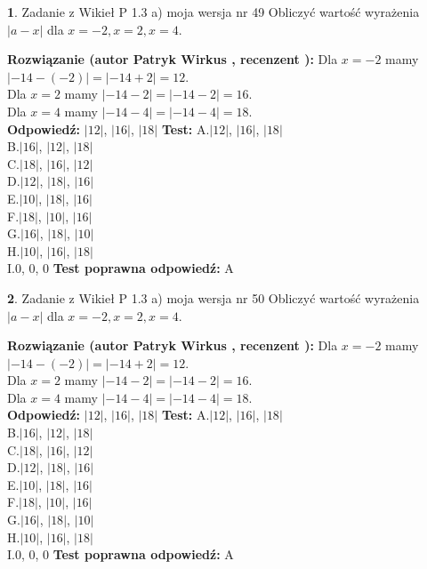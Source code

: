 \documentclass[12pt, a4paper]{article}
\theoremstyle{definition} %
\newtheorem{zad}{}
\newcommand{\zadStart}[1]{\begin{zad}#1\newline}
\newcommand{\zadStop}{\end{zad}}
\newcommand{\rozwStart}[2]{\noindent \textbf{Rozwiązanie (autor #1 , recenzent #2): }\newline}
\newcommand{\rozwStop}{\newline}
\newcommand{\odpStart}{\noindent \textbf{Odpowiedź:}\newline}
\newcommand{\odpStop}{\newline}
\newcommand{\testStart}{\noindent \textbf{Test:}\newline}
\newcommand{\testStop}{\newline}
\newcommand{\kluczStart}{\noindent \textbf{Test poprawna odpowiedź:}\newline}
\newcommand{\kluczStop}{\newline}
\begin{document}
\zadStart{Zadanie z Wikieł P 1.3 a) moja wersja nr 49}
Obliczyć wartość wyrażenia $|a - x|$ dla $x=-2,x=2,x=4$.
\zadStop
\rozwStart{Patryk Wirkus}{}
Dla $x = -2$ mamy $|-14 - (-2)| = |-14 + 2| = 12$.\\
Dla $x = 2$ mamy $|-14 - 2| = |-14 - 2| = 16$.\\
Dla $x = 4$ mamy $|-14 - 4| = |-14 - 4| = 18$.\\
\rozwStop
\odpStart
$|12|$, $|16|$, $|18|$
\odpStop
\testStart
A.$|12|$, $|16|$, $|18|$\\
B.$|16|$, $|12|$, $|18|$\\
C.$|18|$, $|16|$, $|12|$\\
D.$|12|$, $|18|$, $|16|$\\
E.$|10|$, $|18|$, $|16|$\\
F.$|18|$, $|10|$, $|16|$\\
G.$|16|$, $|18|$, $|10|$\\
H.$|10|$, $|16|$, $|18|$\\
I.$0$, $0$, $0$
\testStop
\kluczStart
A
\kluczStop



\zadStart{Zadanie z Wikieł P 1.3 a) moja wersja nr 50}
Obliczyć wartość wyrażenia $|a - x|$ dla $x=-2,x=2,x=4$.
\zadStop
\rozwStart{Patryk Wirkus}{}
Dla $x = -2$ mamy $|-14 - (-2)| = |-14 + 2| = 12$.\\
Dla $x = 2$ mamy $|-14 - 2| = |-14 - 2| = 16$.\\
Dla $x = 4$ mamy $|-14 - 4| = |-14 - 4| = 18$.\\
\rozwStop
\odpStart
$|12|$, $|16|$, $|18|$
\odpStop
\testStart
A.$|12|$, $|16|$, $|18|$\\
B.$|16|$, $|12|$, $|18|$\\
C.$|18|$, $|16|$, $|12|$\\
D.$|12|$, $|18|$, $|16|$\\
E.$|10|$, $|18|$, $|16|$\\
F.$|18|$, $|10|$, $|16|$\\
G.$|16|$, $|18|$, $|10|$\\
H.$|10|$, $|16|$, $|18|$\\
I.$0$, $0$, $0$
\testStop
\kluczStart
A
\kluczStop
\end{document}
